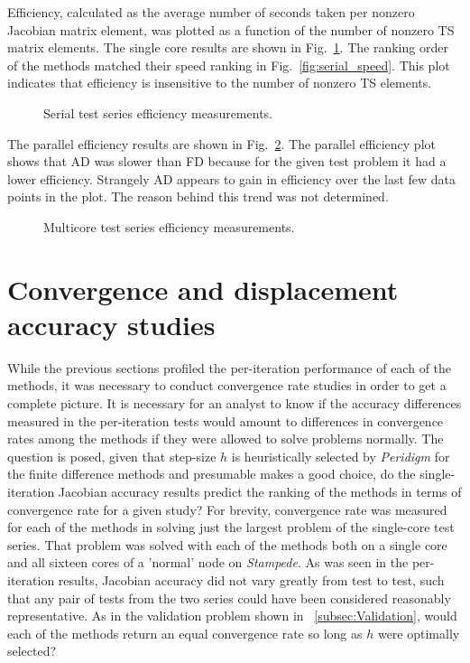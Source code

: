 \documentclass[preprint,12pt]{elsarticle}
\begin{document}
Efficiency, calculated as the average number of seconds taken per nonzero Jacobian matrix element, was plotted as a function of the number of nonzero TS matrix elements. The single core results are shown in Fig.~\ref{fig:serial_efficiency}.  The ranking order of the methods
matched their speed ranking in Fig.~\ref{fig:serial_speed}. This plot indicates that efficiency is insensitive to the number of nonzero TS elements.  
%
\begin{figure}[tbp]
  \centering
  \scalebox{1.0}{}
  \caption{Serial test series efficiency measurements.}
  \label{fig:serial_efficiency}
\end{figure}
%
The parallel efficiency results are shown in Fig.~\ref{fig:multi_efficiency}. The parallel efficiency plot shows that AD was slower than FD because for the given test problem it had a lower efficiency. Strangely AD appears to gain in efficiency over the last few data points in the plot. The reason behind this trend was not determined.
%
\begin{figure}[tbp]
  \centering
  \scalebox{1.0}{}
  \caption{Multicore test series efficiency measurements.}
  \label{fig:multi_efficiency}
\end{figure}

\section{Convergence and displacement accuracy studies} 
\label{sec:PeridigmConvergenceStudy}
%
While the previous sections profiled the per-iteration performance of each of
the methods, it was necessary to conduct convergence rate studies in order to
get a complete picture. It is necessary for an analyst to know if the
accuracy differences measured in the per-iteration tests would amount to
differences in convergence rates among the methods if they were allowed to solve problems
normally. The question is posed, given that step-size $h$ is heuristically
selected by \emph{Peridigm} for the finite difference methods and presumable
makes a good choice, do the single-iteration Jacobian accuracy results predict
the ranking of the methods in terms of convergence rate for a given study? For
brevity, convergence rate was measured for each of the methods in solving just
the largest problem of the single-core test series. That problem was solved with each of the methods
both on a single core and all sixteen cores of a 'normal' node on \emph{Stampede}. As was seen in the per-iteration results,
Jacobian accuracy did not vary greatly from test to test, such that any pair of tests
from the two series could have been considered reasonably representative. As in
the validation problem shown in ~\ref{subsec:Validation}, would each of the methods return an
equal convergence rate so long as $h$ were optimally selected? 
\end{document}
